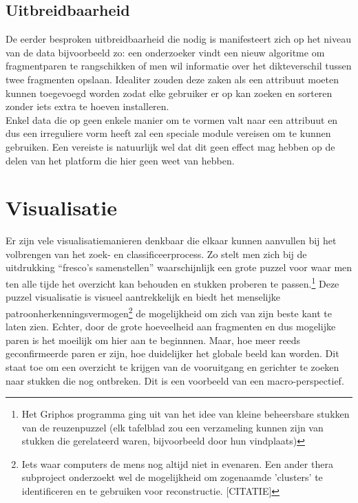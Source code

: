 
\subsection{Uitbreidbaarheid}
De eerder besproken uitbreidbaarheid die nodig is manifesteert zich op het niveau van de data bijvoorbeeld zo: een onderzoeker vindt een nieuw algoritme om fragmentparen te rangschikken of men wil informatie over het dikteverschil tussen twee fragmenten opslaan. Idealiter zouden deze zaken als een attribuut moeten kunnen toegevoegd worden zodat elke gebruiker er op kan zoeken en sorteren zonder iets extra te hoeven installeren.\\
 
Enkel data die op geen enkele manier om te vormen valt naar een attribuut en dus een irreguliere vorm heeft zal een speciale module vereisen om te kunnen gebruiken. Een vereiste is natuurlijk wel dat dit geen effect mag hebben op de delen van het platform die hier geen weet van hebben.
 
\section{Visualisatie}
Er zijn vele visualisatiemanieren denkbaar die elkaar kunnen aanvullen bij het volbrengen van het zoek- en classificeerprocess. Zo stelt men zich bij de uitdrukking ``fresco's samenstellen'' waarschijnlijk een grote puzzel voor waar men ten alle tijde het overzicht kan behouden en stukken proberen te passen.\footnote{Het Griphos programma ging uit van het idee van kleine beheersbare stukken van de reuzenpuzzel (elk tafelblad zou een verzameling kunnen zijn van stukken die gerelateerd waren, bijvoorbeeld door hun vindplaats)} Deze puzzel visualisatie is visueel aantrekkelijk en biedt het menselijke patroonherkenningsvermogen\footnote{Iets waar computers de mens nog altijd niet in evenaren. Een ander thera subproject onderzoekt wel de mogelijkheid om zogenaamde 'clusters' te identificeren en te gebruiken voor reconstructie. [CITATIE]} de mogelijkheid om zich van zijn beste kant te laten zien. Echter, door de grote hoeveelheid aan fragmenten en dus mogelijke paren is het moeilijk om hier aan te beginnnen. Maar, hoe meer reeds geconfirmeerde paren er zijn, hoe duidelijker het globale beeld kan worden. Dit staat toe om een overzicht te krijgen van de vooruitgang en gerichter te zoeken naar stukken die nog ontbreken. Dit is een voorbeeld van een macro-perspectief.\\

